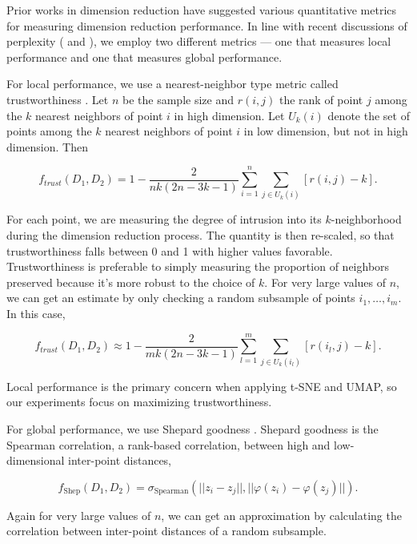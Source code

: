 \documentclass{article}
\begin{document}
Prior works in dimension reduction have suggested various quantitative metrics for measuring dimension reduction performance. In line with recent discussions of perplexity (\cite{t-SNE cell} and \cite{large DR unreliable}), we employ two different metrics --- one that measures local performance and one that measures global performance.

For local performance, we use a nearest-neighbor type metric called trustworthiness \cite{trustworthiness}. Let $n$ be the sample size and $r(i,j)$ the rank of point $j$ among the $k$ nearest neighbors of point $i$ in high dimension. Let $U_k(i)$ denote the set of points among the $k$ nearest neighbors of point $i$ in low dimension, but not in high dimension. Then \begin{linenomath}$$f_{trust}(D_1, D_2) = 1 - \frac{2}{nk(2n - 3k - 1)}\sum_{i=1}^n \sum_{j \in U_k(i)} \left[ r(i,j) - k \right].$$\end{linenomath} For each point, we are measuring the degree of intrusion into its $k$-neighborhood during the dimension reduction process. The quantity is then re-scaled, so that trustworthiness falls between 0 and 1 with higher values favorable. Trustworthiness is preferable to simply measuring the proportion of neighbors preserved because it's more robust to the choice of $k$. For very large values of $n$, we can get an estimate by only checking a random subsample of points $i_1, \hdots, i_m$. In this case, \begin{linenomath}$$f_{trust}(D_1, D_2) \approx 1 - \frac{2}{mk(2n - 3k - 1)}\sum_{l=1}^m \sum_{j \in U_k(i_l)} \left[ r(i_l,j) - k \right].$$\end{linenomath} Local performance is the primary concern when applying t-SNE and UMAP, so our experiments focus on maximizing trustworthiness.

For global performance, we use Shepard goodness \cite{quantitative survey}. Shepard goodness is the Spearman correlation, a rank-based correlation, between high and low-dimensional inter-point distances, \begin{linenomath}$$f_\textrm{Shep}(D_1, D_2) = \sigma_\textrm{Spearman}(||z_i - z_j||, ||\varphi(z_i) - \varphi(z_j)||).$$\end{linenomath} Again for very large values of $n$, we can get an approximation by calculating the correlation between inter-point distances of a random subsample.
\end{document}
